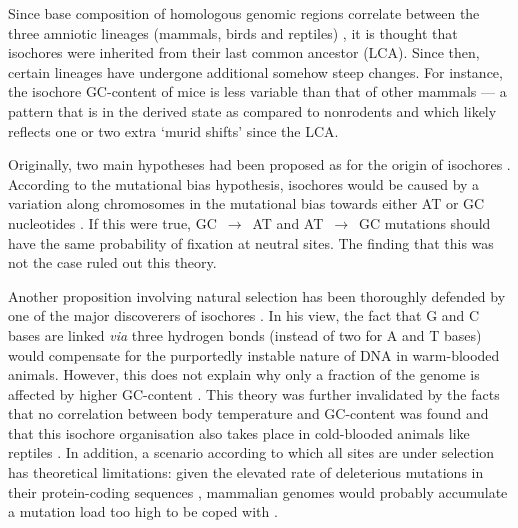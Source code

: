 Since base composition of homologous genomic regions correlate between the three amniotic lineages (mammals, birds and reptiles) \citep{kadi1993compositional,caccio1994singlecopy,hughes1999warmblooded}, it is thought that isochores were inherited from their last common ancestor (LCA).
Since then, certain lineages have undergone additional somehow steep changes.
For instance, the isochore GC-content of mice is less variable than that of other mammals — a pattern that is in the derived state as compared to nonrodents \citep{galtier1998isochore} and which likely reflects one \citep{mouchiroud1988compositional} or two \citep{smith2002compositional} extra ‘murid shifts’ since the LCA\@.

Originally, two main hypotheses had been proposed as for the origin of isochores \citep[reviewed in][]{duret2009biased}.
According to the mutational bias hypothesis, isochores would be caused by a variation along chromosomes in the mutational bias towards either AT or GC nucleotides \citep{filipski1988why,wolfe1989mutation,francino1999isochores,fryxell2000cytosine}.
If this were true, GC~$\rightarrow$~AT and AT~$\rightarrow$~GC mutations should have the same probability of fixation at neutral sites.
The finding that this was not the case \citep{eyre-walker1999evidence, smith2001synonymous, lercher2002evolution, webster2004fixation, spencer2006influence} ruled out this theory.

Another proposition involving natural selection has been thoroughly defended by one of the major discoverers of isochores \citep{bernardi2000isochores,bernardi2007neoselectionist}. 
In his view, the fact that G and C bases are linked \textit{via} three hydrogen bonds (instead of two for A and T bases) would compensate for the purportedly instable nature of DNA in warm-blooded animals.
However, this does not explain why only a fraction of the genome is affected by higher GC-content \citep{duret2009biased}.
This theory was further invalidated by the facts that no correlation between body temperature and GC-content was found \citep{belle2002analysis,ream2003base} and that this isochore organisation also takes place in cold-blooded animals like reptiles \citep{hughes1999warmblooded,hamada2003presence,costantini2016anolis}.
In addition, a scenario according to which all sites are under selection has theoretical limitations: given the elevated rate of deleterious mutations in their protein-coding sequences \citep{eyre-walker1999high,keightley2000deleterious}, mammalian genomes would probably accumulate a mutation load too high to be coped with \citep{eyre-walker2001evolution}.

